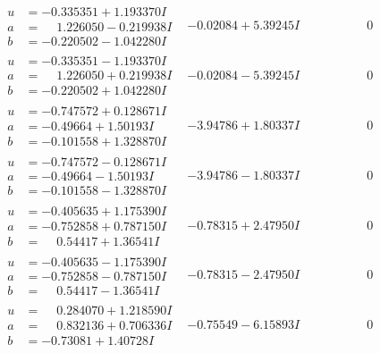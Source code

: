 \documentclass[1p]{elsarticle_modified}
\theoremstyle{definition}
\begin{document}
$$\begin{array}{c|c|c}
\begin{aligned}
u &= -0.335351 + 1.193370 I \\
a &= \phantom{-}1.226050 - 0.219938 I \\
b &= -0.220502 - 1.042280 I\end{aligned}
 & -0.02084 + 5.39245 I & \phantom{-0.000000 } 0 \\ \hline\begin{aligned}
u &= -0.335351 - 1.193370 I \\
a &= \phantom{-}1.226050 + 0.219938 I \\
b &= -0.220502 + 1.042280 I\end{aligned}
 & -0.02084 - 5.39245 I & \phantom{-0.000000 } 0 \\ \hline\begin{aligned}
u &= -0.747572 + 0.128671 I \\
a &= -0.49664 + 1.50193 I \\
b &= -0.101558 + 1.328870 I\end{aligned}
 & -3.94786 + 1.80337 I & \phantom{-0.000000 } 0 \\ \hline\begin{aligned}
u &= -0.747572 - 0.128671 I \\
a &= -0.49664 - 1.50193 I \\
b &= -0.101558 - 1.328870 I\end{aligned}
 & -3.94786 - 1.80337 I & \phantom{-0.000000 } 0 \\ \hline\begin{aligned}
u &= -0.405635 + 1.175390 I \\
a &= -0.752858 + 0.787150 I \\
b &= \phantom{-}0.54417 + 1.36541 I\end{aligned}
 & -0.78315 + 2.47950 I & \phantom{-0.000000 } 0 \\ \hline\begin{aligned}
u &= -0.405635 - 1.175390 I \\
a &= -0.752858 - 0.787150 I \\
b &= \phantom{-}0.54417 - 1.36541 I\end{aligned}
 & -0.78315 - 2.47950 I & \phantom{-0.000000 } 0 \\ \hline\begin{aligned}
u &= \phantom{-}0.284070 + 1.218590 I \\
a &= \phantom{-}0.832136 + 0.706336 I \\
b &= -0.73081 + 1.40728 I\end{aligned}
 & -0.75549 - 6.15893 I & \phantom{-0.000000 } 0 \\ \hline\begin{aligned}

\end{aligned}
\end{array}$$
\end{document}
